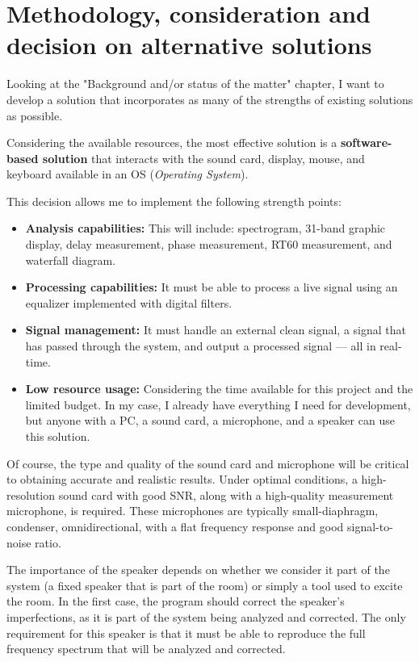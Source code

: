 \chapter{Methodology, consideration and decision on alternative solutions}

Looking at the "Background and/or status of the matter" chapter, I want to develop a solution that incorporates as many of the strengths of existing solutions as possible.

Considering the available resources, the most effective solution is a \textbf{software-based solution} that interacts with the sound card, display, mouse, and keyboard available in an OS (\textit{Operating System}).

This decision allows me to implement the following strength points:

\begin{itemize}
	\item \textbf{Analysis capabilities:} This will include: spectrogram, 31-band graphic display, delay measurement, phase measurement, RT60 measurement, and waterfall diagram.
	
	\item \textbf{Processing capabilities:} It must be able to process a live signal using an equalizer implemented with digital filters.
	
	\item \textbf{Signal management:} It must handle an external clean signal, a signal that has passed through the system, and output a processed signal — all in real-time.
	
	\item \textbf{Low resource usage:} Considering the time available for this project and the limited budget. In my case, I already have everything I need for development, but anyone with a PC, a sound card, a microphone, and a speaker can use this solution.
\end{itemize}

Of course, the type and quality of the sound card and microphone will be critical to obtaining accurate and realistic results. Under optimal conditions, a high-resolution sound card with good SNR, along with a high-quality measurement microphone, is required. These microphones are typically small-diaphragm, condenser, omnidirectional, with a flat frequency response and good signal-to-noise ratio.

The importance of the speaker depends on whether we consider it part of the system (a fixed speaker that is part of the room) or simply a tool used to excite the room. In the first case, the program should correct the speaker's imperfections, as it is part of the system being analyzed and corrected. The only requirement for this speaker is that it must be able to reproduce the full frequency spectrum that will be analyzed and corrected.

